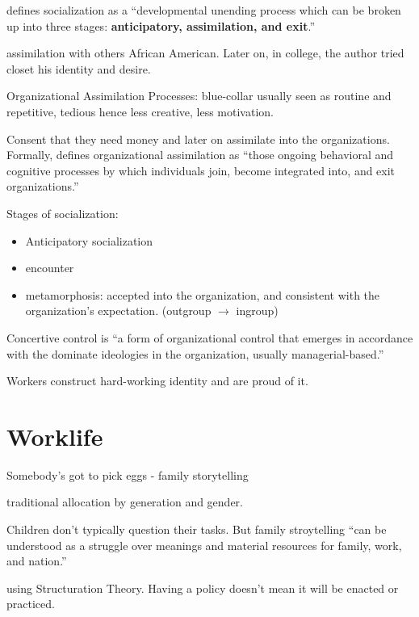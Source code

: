 \documentclass[
]{book}
\providecommand{\tightlist}{%
  \setlength{\itemsep}{0pt}\setlength{\parskip}{0pt}}
\begin{document}
\citep{ferguson2017}

\citep{jablin_1987} defines socialization as a ``developmental unending process which can be broken up into three stages:
\textbf{anticipatory, assimilation, and exit}.''

assimilation with others African American. Later on, in college, the author tried closet his identity and desire.

\citep{Gibson_2000}

Organizational Assimilation Processes: blue-collar usually seen as routine and repetitive, tedious hence less creative,
less motivation.

Consent that they need money and later on assimilate into the organizations. Formally, \citep[pp.712]{jablin_1987} defines
organizational assimilation as ``those ongoing behavioral and cognitive processes by which individuals join, become
integrated into, and exit organizations.''

Stages of socialization:

\begin{itemize}
\tightlist
\item
  Anticipatory socialization
\item
  encounter
\item
  metamorphosis: accepted into the organization, and consistent with the organization's expectation. (outgroup \(\to\)
  ingroup)
\end{itemize}

Concertive control is ``a form of organizational control that emerges in accordance with the dominate ideologies in the
organization, usually managerial-based.''

Workers construct hard-working identity and are proud of it.

\hypertarget{worklife}{%
\chapter{Worklife}\label{worklife}}

\citep{Langellier_2006} Somebody's got to pick eggs - family storytelling

traditional allocation by generation and gender.

Children don't typically question their tasks. But family stroytelling ``can be understood as a struggle over meanings
and material resources for family, work, and nation.''

\citep{Kirby_2002}

using \citep{gidden_1984} Structuration Theory. Having a policy doesn't mean it will be enacted or practiced.
\end{document}
